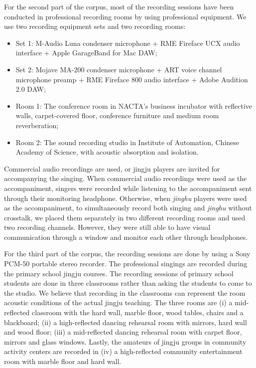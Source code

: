 For the second part of the corpus, most of the recording sessions have been conducted in professional recording rooms by using professional equipment. We use two recording equipment sets and two recording rooms:

\begin{itemize}[noitemsep]
    \item Set 1: M-Audio Luna condenser microphone + RME Fireface UCX audio interface + Apple GarageBand for Mac DAW;
    \item Set 2: Mojave MA-200 condenser microphone + ART voice channel microphone preamp + RME Fireface 800 audio interface + Adobe Audition 2.0 DAW;
    \item Room 1: The conference room in NACTA's business incubator with reflective walls, carpet-covered floor, conference furniture and medium room reverberation;
    \item Room 2: The sound recording studio in Institute of Automation, Chinese Academy of Science, with acoustic absorption and isolation.
\end{itemize}

Commercial audio recordings are used, or jingju players are invited for accompanying the singing. When commercial audio recordings were used as the accompaniment, singers were recorded while listening to the accompaniment sent through their monitoring headphone. Otherwise, when \textit{jinghu} players were used as the accompaniment, to simultaneously record both singing and \textit{jinghu} without crosstalk, we placed them separately in two different recording rooms and used two recording channels. However, they were still able to have visual communication through a window and monitor each other through headphones.

For the third part of the corpus, the recording sessions are done by using a Sony PCM-50 portable stereo recorder. The professional singings are recorded during the primary school jingju courses. The recording sessions of primary school students are done in three classrooms rather than asking the students to come to the studio. We believe that recording in the classrooms can represent the room acoustic conditions of the actual jingju teaching. The three rooms are (i) a mid-reflected classroom with the hard wall, marble floor, wood tables, chairs and a blackboard; (ii) a high-reflected dancing rehearsal room with mirrors, hard wall and wood floor; (iii) a mid-reflected dancing rehearsal room with carpet floor, mirrors and glass windows. Lastly, the amateurs of jingju groups in community activity centers are recorded in (iv) a high-reflected community entertainment room with marble floor and hard wall.

